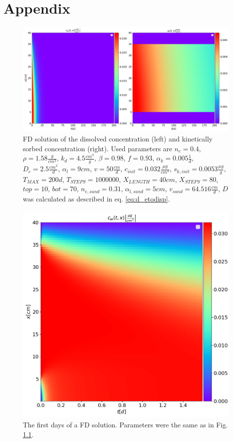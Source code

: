 \chapter{Appendix}
\begin{figure}[h!]
	\centering
	\includegraphics[scale=0.3]{images/sol_fd_sand.png}
\caption[Further FD solution]{FD solution of the dissolved concentration (left) and kinetically sorbed concentration (right). Used parameters are $n_e = 0.4$, $\rho = 1.58 \frac{g}{cm^3}$, $k_d = 4.5 \frac{cm^3}{g}$, $\beta = 0.98$, $f = 0.93$, $\alpha_k = 0.005 \frac{1}{d}$, $D_e = 2.5\frac{cm^2}{d}$, $\alpha_l = 9cm$, $v=50\frac{cm}{d}$, $c_{init} = 0.032 \frac{\mu g}{cm^3}$, $s_{k, init} = 0.0053 \frac{\mu g}{g}$, $T_{MAX} = 200d$, $T_{STEPS} = 1000000$, $X_{LENGTH} = 40cm$, $X_{STEPS} = 80$, $top = 10$, $bot=70$, $n_{e, sand} = 0.31$, $\alpha_{l, sand} = 5cm$, $v_{sand} = 64.516 \frac{cm}{d}$, $D$ was calculated as described in eq. \ref{eq:d_etodisp}.}
\label{fig:hyd_app_1}
\end{figure}
\begin{figure}
	\centering
	\includegraphics[scale=0.3]{images/sol_fd_sand_1d.png}
\caption[The first days of a FD solution]{The first days of a FD solution. Parameters were the same as in Fig. \ref{fig:hyd_app_1}.}
\label{fig:hyd_app_2}
\end{figure}
